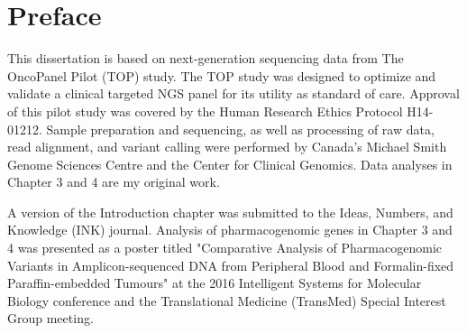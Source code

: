 
\chapter{Preface}

This dissertation is based on next-generation sequencing data from The OncoPanel Pilot (TOP) study. The TOP study was designed to optimize and validate a clinical targeted NGS panel for its utility as standard of care. Approval of this pilot study was covered by the Human Research Ethics Protocol H14-01212. Sample preparation and sequencing, as well as processing of raw data, read alignment, and variant calling were performed by Canada's Michael Smith Genome Sciences Centre and the Center for Clinical Genomics. Data analyses in Chapter 3 and 4 are my original work.

A version of the Introduction chapter was submitted to the Ideas, Numbers, and Knowledge (INK) journal. Analysis of pharmacogenomic genes in Chapter 3 and 4 was presented as a poster titled "Comparative Analysis of Pharmacogenomic Variants in Amplicon-sequenced DNA from Peripheral Blood and Formalin-fixed Paraffin-embedded Tumours" at the 2016 Intelligent Systems for Molecular Biology conference and the Translational Medicine (TransMed) Special Interest Group meeting.
